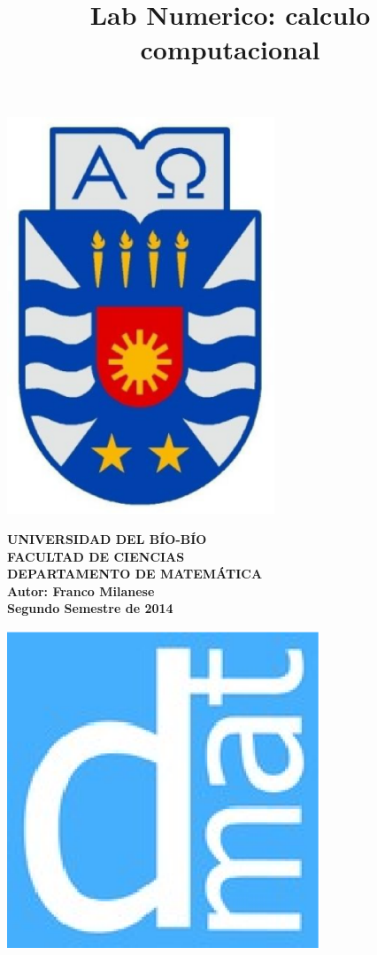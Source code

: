 \documentclass[12pt,letterpaper]{article}
\begin{document}
\title{Lab Numerico: calculo computacional}
{\begin{minipage}{2cm}
\hspace*{1cm}\includegraphics[width=0.6\textwidth]{escubo-ubb.eps}
\end{minipage}
\begin{minipage}{12cm}
\small
{\bf \rm
{\hspace*{3.1cm} {\footnotesize UNIVERSIDAD DEL B\'IO-B\'IO} \\
 \hspace*{3.7cm} {\scriptsize FACULTAD DE CIENCIAS}  \\
  \hspace*{2.9cm} {\scriptsize DEPARTAMENTO DE MATEM\'ATICA}  \\
\hspace*{3.75cm} {\scriptsize Autor: Franco Milanese}\\
\hspace*{3.75cm} {\scriptsize Segundo Semestre de 2014}}}
\end{minipage}}
{\begin{minipage}{2cm}
\hspace*{-0.5cm}\vspace*{-0.05cm}\includegraphics[width=0.7\textwidth]{escudo-dmat.eps}
\end{minipage}}
\end{document}
